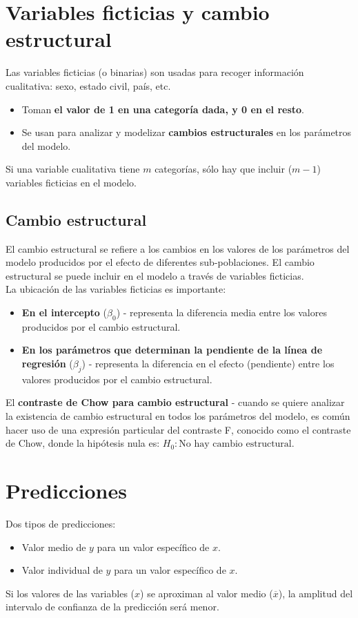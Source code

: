 \documentclass[10pt, a4paper, landscape]{extarticle}
\begin{document}
\begin{multicols}{3}
\section*{Variables ficticias y cambio estructural}
	Las variables ficticias (o binarias) son usadas para recoger información cualitativa: sexo, estado civil, país, etc.
	\begin{itemize}[leftmargin=*]
		\item Toman \textbf{el valor de 1 en una categoría dada, y 0 en el resto}.
		\item Se usan para analizar y modelizar \textbf{cambios estructurales} en los parámetros del modelo.
	\end{itemize}
	Si una variable cualitativa tiene $m$ categorías, sólo hay que incluir ($m-1$) variables ficticias en el modelo.
	\subsection*{Cambio estructural}
		El cambio estructural se refiere a los cambios en los valores de los parámetros del modelo producidos por el efecto de diferentes sub-poblaciones. El cambio estructural se puede incluir en el modelo a través de variables ficticias. \\
		La ubicación de las variables ficticias es importante:
		\begin{itemize}[leftmargin=*]
			\item \textbf{En el intercepto} ($\beta_0$) - representa la diferencia media entre los valores producidos por el cambio estructural.
			\item \textbf{En los parámetros que determinan la pendiente de la línea de regresión} ($\beta_j$) - representa la diferencia en el efecto (pendiente) entre los valores producidos por el cambio estructural.
		\end{itemize}
		El \textbf{contraste de Chow para cambio estructural} - cuando se quiere analizar la existencia de cambio estructural en todos los parámetros del modelo, es común hacer uso de una expresión particular del contraste F, conocido como el contraste de Chow, donde la hipótesis nula es: $H_0: \text{No hay cambio estructural}$.

\section*{Predicciones}
	Dos tipos de predicciones:
	\begin{itemize}[leftmargin=*]
		\item Valor medio de $y$ para un valor específico de $x$.
		\item Valor individual de $y$ para un valor específico de $x$.
	\end{itemize}
	Si los valores de las variables ($x$) se aproximan al valor medio ($\overline{x}$), la amplitud del intervalo de confianza de la predicción será menor. 
\columnbreak

\end{multicols}
\end{document}
